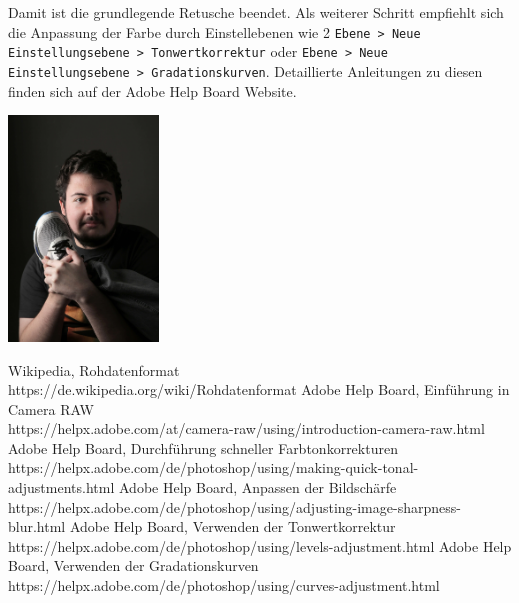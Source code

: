 \documentclass{school}
\begin{document}
\begin{outline}[enumerate]
\1 Damit ist die grundlegende Retusche beendet. Als weiterer Schritt empfiehlt sich die Anpassung der Farbe durch Einstellebenen wie 2 \texttt{Ebene > Neue Einstellungsebene > Tonwertkorrektur} oder \texttt{Ebene > Neue Einstellungsebene > Gradationskurven}. Detaillierte Anleitungen zu diesen finden sich auf der Adobe Help Board Website\cite{adobe-levels}\cite{adobe-curves}.

\includegraphics[height=6cm]{ende.jpg}

\end{outline}

\begin{thebibliography}{9}

 Wikipedia, Rohdatenformat \\ https://de.wikipedia.org/wiki/Rohdatenformat
 Adobe Help Board, Einführung in Camera RAW \\ https://helpx.adobe.com/at/camera-raw/using/introduction-camera-raw.html
 Adobe Help Board, Durchführung schneller Farbtonkorrekturen \\ https://helpx.adobe.com/de/photoshop/using/making-quick-tonal-adjustments.html
 Adobe Help Board, Anpassen der Bildschärfe \\ https://helpx.adobe.com/de/photoshop/using/adjusting-image-sharpness-blur.html
 Adobe Help Board, Verwenden der Tonwertkorrektur \\ https://helpx.adobe.com/de/photoshop/using/levels-adjustment.html
 Adobe Help Board, Verwenden der Gradationskurven \\ https://helpx.adobe.com/de/photoshop/using/curves-adjustment.html

\end{thebibliography}
\end{document}

